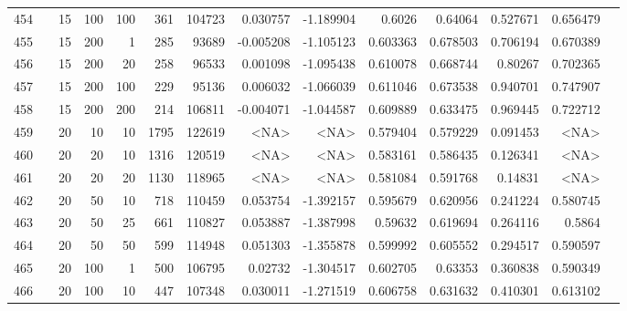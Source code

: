\begin{longtable}{llrrrrrrrrrrrr}
		454 & &           15 &               100 &          100 &          361 &     104723 &  0.030757 & -1.189904 &    0.6026 &     0.64064 &       0.527671 &  0.656479 \\
		455 & &           15 &               200 &            1 &          285 &      93689 & -0.005208 & -1.105123 &  0.603363 &    0.678503 &       0.706194 &  0.670389 \\
		456 & &           15 &               200 &           20 &          258 &      96533 &  0.001098 & -1.095438 &  0.610078 &    0.668744 &        0.80267 &  0.702365 \\
		457 & &           15 &               200 &          100 &          229 &      95136 &  0.006032 & -1.066039 &  0.611046 &    0.673538 &       0.940701 &  0.747907 \\
		458 & &           15 &               200 &          200 &          214 &     106811 & -0.004071 & -1.044587 &  0.609889 &    0.633475 &       0.969445 &  0.722712 \\
		459 & &           20 &                10 &           10 &           1795 &     122619 &      <NA> &      <NA> &  0.579404 &    0.579229 &       0.091453 &    <NA> \\
		460 & &           20 &                20 &           10 &           1316 &     120519 &      <NA> &      <NA> &  0.583161 &    0.586435 &       0.126341 &  <NA> \\
		461 & &           20 &                20 &           20 &           1130 &     118965 &      <NA> &      <NA> &  0.581084 &    0.591768 &        0.14831 &  <NA> \\
		462 & &           20 &                50 &           10 &          718 &     110459 &  0.053754 & -1.392157 &  0.595679 &    0.620956 &       0.241224 &  0.580745 \\
		463 & &           20 &                50 &           25 &          661 &     110827 &  0.053887 & -1.387998 &   0.59632 &    0.619694 &       0.264116 &    0.5864 \\
		464 & &           20 &                50 &           50 &          599 &     114948 &  0.051303 & -1.355878 &  0.599992 &    0.605552 &       0.294517 &  0.590597 \\
		465 & &           20 &               100 &            1 &          500 &     106795 &   0.02732 & -1.304517 &  0.602705 &     0.63353 &       0.360838 &  0.590349 \\
		466 & &           20 &               100 &           10 &          447 &     107348 &  0.030011 & -1.271519 &  0.606758 &    0.631632 &       0.410301 &  0.613102 \\

\end{longtable}
